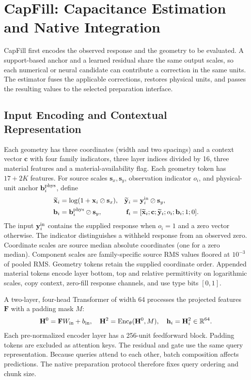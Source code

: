 \section{CapFill: Capacitance Estimation and Native Integration}
CapFill first encodes the observed response and the geometry to be evaluated. A support-based anchor and a learned residual share the same output scales, so each numerical or neural candidate can contribute a correction in the same units. The estimator fuses the applicable corrections, restores physical units, and passes the resulting values to the selected preparation interface.

\subsection{Input Encoding and Contextual Representation}
Each geometry has three coordinates (width and two spacings) and a context vector $\mathbf c$ with four family indicators, three layer indices divided by 16, three material features and a material-availability flag. Each geometry token has $17+2K$ features. For source scales $\mathbf s_x,\mathbf s_y$, observation indicator $o_i$, and physical-unit anchor $\mathbf b^{\rm phys}_i$, define
\begin{align}
\widetilde{\mathbf x}_i&=\log(1+\mathbf x_i\oslash\mathbf s_x),&
\widetilde{\mathbf y}_i&=\mathbf y_i^{\rm in}\oslash\mathbf s_y,\\
\mathbf b_i&=\mathbf b_i^{\rm phys}\oslash\mathbf s_y,&
\mathbf f_i&=[\widetilde{\mathbf x}_i;\mathbf c;\widetilde{\mathbf y}_i;o_i;\mathbf b_i;1;0].
\end{align}
The input $\mathbf y_i^{\rm in}$ contains the supplied response when $o_i=1$ and a zero vector otherwise. The indicator distinguishes a withheld response from an observed zero. Coordinate scales are source median absolute coordinates (one for a zero median). Component scales are family-specific source RMS values floored at $10^{-3}$ of pooled RMS. Geometry tokens retain the supplied coordinate order. Appended material tokens encode layer bottom, top and relative permittivity on logarithmic scales, copy context, zero-fill response channels, and use type bits $[0,1]$.

A two-layer, four-head Transformer of width 64 processes the projected features $\mathbf F$ with a padding mask $M$:
\begin{equation}
\mathbf H^0=\mathbf F W_{\rm in}+b_{\rm in},\quad
\mathbf H^2=\operatorname{Enc}_\theta(\mathbf H^0,M),\quad
\mathbf h_i=\mathbf H^2_i\in\mathbb R^{64}.
\end{equation}
Each pre-normalized encoder layer has a 256-unit feedforward block. Padding tokens are excluded as attention keys. The residual and gate use the same query representation. Because queries attend to each other, batch composition affects predictions. The native preparation protocol therefore fixes query ordering and chunk size.

